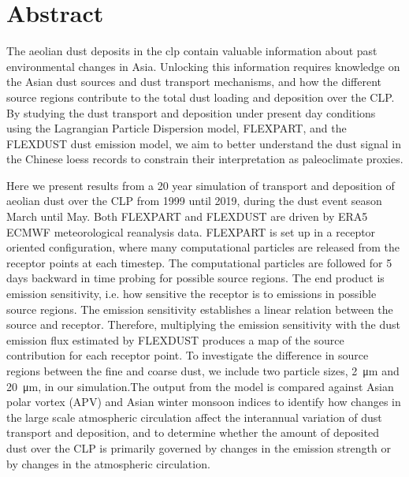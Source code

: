 \chapter*{Abstract}
The aeolian dust deposits in the \acrfull{clp} contain valuable information about past environmental changes in Asia. Unlocking this information requires knowledge on the Asian dust sources and dust transport mechanisms, and how the different source regions contribute to the total dust loading and deposition over the CLP.  By studying the dust transport and deposition under present day conditions using the Lagrangian Particle Dispersion model,  FLEXPART,  and the FLEXDUST dust emission model, we aim to better understand the dust signal in the Chinese loess records to constrain their interpretation as paleoclimate proxies.  

Here we present results from a 20 year simulation of transport and deposition of aeolian dust over the CLP from 1999 until 2019, during the dust event season March until May. Both FLEXPART and FLEXDUST are driven by ERA5 ECMWF meteorological reanalysis data. FLEXPART is set up in a receptor oriented configuration, where many computational particles are released from the receptor points at each timestep. The computational particles are followed for 5 days backward in time probing for possible source regions. The end product is emission sensitivity, i.e. how sensitive the receptor is to emissions in possible source regions. The emission sensitivity establishes a linear relation between the source and receptor. Therefore, multiplying the emission sensitivity with the dust emission flux estimated by FLEXDUST produces a map of the source contribution for each receptor point. To investigate the difference in source regions between the fine and coarse dust, we include two particle sizes, \SI{2}{\micro\metre}  and \SI{20}{\micro\metre}, in our simulation.The output from the model is compared against Asian polar vortex (APV) and Asian winter monsoon indices to identify how changes in the large scale atmospheric circulation affect the interannual variation of dust transport and deposition, and to determine whether the amount of deposited dust over the CLP is primarily governed by changes in the emission strength or by changes in the atmospheric circulation.  
